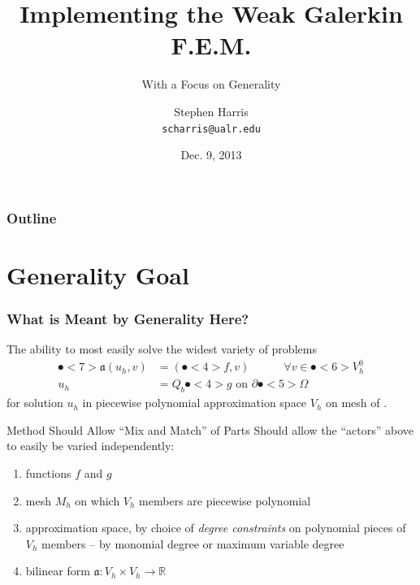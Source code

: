 \documentclass[compress]{beamer}
\title[Implementing WGFEM]{Implementing the Weak Galerkin F.E.M.}
\subtitle{With a Focus on Generality}
\author{Stephen Harris \\ \texttt{scharris@ualr.edu}}
\date{Dec. 9, 2013}
\begin{document}
\begin{frame}
  \titlepage
\end{frame}

\begin{frame}
  \frametitle{Outline}
  \tableofcontents[pausesections]
\end{frame}

\section{Generality Goal}

\begin{frame}
  \frametitle{What is Meant by Generality Here?}
  \pause
  The ability to most easily solve the widest variety of problems
    \begin{align*}
      \spot<7>{\mathfrak{a}}(u_h,v) & = (\spot<4>{f},v)\quad\quad\quad \forall{v} \in \spot<6>{V_h^0} \\
      u_h & = Q_b \spot<4>{g} \text{ on } \partial\spot<5>{\Omega}
    \end{align*}
    for solution $u_h$ in piecewise polynomial approximation space $V_h$ on mesh  of .
  \pause

  \begin{block}{Method Should Allow ``Mix and Match'' of Parts}
    Should allow the ``actors'' above to easily be varied independently:
    \pause
    \begin{enumerate}[<+->]
      \item functions $f$ and $g$
      \item mesh $M_h$ on which $V_h$ members are piecewise polynomial
      \item approximation space, by choice of \emph{degree constraints} on polynomial pieces of $V_h$ members 
            -- by monomial degree or maximum variable degree
      \item bilinear form $\mathfrak{a}: V_h \times V_h \rightarrow \mathbb{R}$
    \end{enumerate}
  \end{block}

\end{frame}
\end{document}
